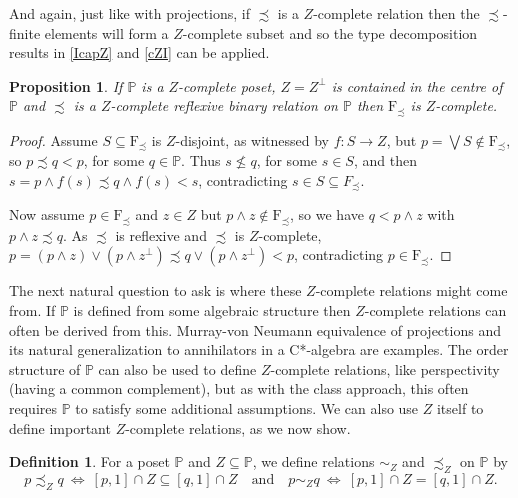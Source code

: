 \documentclass{amsart}
\newtheorem{prp}[prp]{Proposition}
\theoremstyle{definition}
\newtheorem{dfn}[dfn]{Definition}
\numberwithin{equation}{section}
\begin{document}
And again, just like with projections, if $\precsim$ is a $Z$-complete relation then the $\precsim$-finite elements will form a $Z$-complete subset and so the type decomposition results in \autoref{IcapZ} and \autoref{cZI} can be applied.



\begin{prp}\label{fincom}
If $\mathbb{P}$ is a $Z$-complete poset, $Z=Z^\perp$ is contained in the centre of $\mathbb{P}$ and $\precsim$ is a $Z$-complete reflexive binary relation on $\mathbb{P}$ then $\mathrm{F}_\precsim$ is $Z$-complete.
\end{prp}

\begin{proof}
Assume $S\subseteq\mathrm{F}_\precsim$ is $Z$-disjoint, as witnessed by $f:S\rightarrow Z$, but $p=\bigvee S\notin\mathrm{F}_\precsim$, so $p\precsim q<p$, for some $q\in\mathbb{P}$.  Thus $s\nleq q$, for some $s\in S$, and then $s=p\wedge f(s)\precsim q\wedge f(s)<s$, contradicting $s\in S\subseteq F_\precsim$.

Now assume $p\in\mathrm{F}_\precsim$ and $z\in Z$ but $p\wedge z\notin\mathrm{F}_\precsim$, so we have $q<p\wedge z$ with $p\wedge z\precsim q$.  As $\precsim$ is reflexive and $\precsim$ is $Z$-complete, $p=(p\wedge z)\vee(p\wedge z^\perp)\precsim q\vee(p\wedge z^\perp)<p$, contradicting $p\in\mathrm{F}_\precsim$.
\end{proof}

The next natural question to ask is where these $Z$-complete relations might come from.  If $\mathbb{P}$ is defined from some algebraic structure then $Z$-complete relations can often be derived from this.  Murray-von Neumann equivalence of projections and its natural generalization to annihilators in a C*-algebra are examples.  The order structure of $\mathbb{P}$ can also be used to define $Z$-complete relations, like perspectivity (having a common complement), but as with the class approach, this often requires $\mathbb{P}$ to satisfy some additional assumptions.  We can also use $Z$ itself to define important $Z$-complete relations, as we now show.

\begin{dfn}
For a poset $\mathbb{P}$ and $Z\subseteq\mathbb{P}$, we define relations $\sim_Z$ and $\precsim_Z$ on $\mathbb{P}$ by
\[p\precsim_Zq\ \Leftrightarrow\ [p,1]\cap Z\subseteq[q,1]\cap Z\quad\textrm{and}\quad p\sim_Zq\ \Leftrightarrow\ [p,1]\cap Z=[q,1]\cap Z.\]
\end{dfn}
\end{document}
